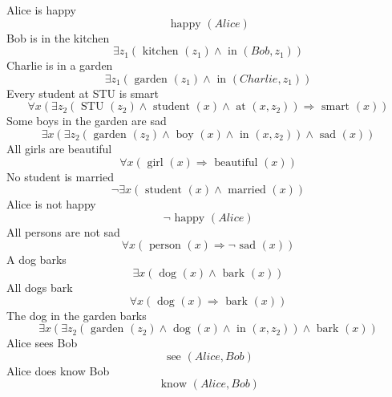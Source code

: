 \documentclass{article}
\begin{document}
Alice is happy
$$
\text{ happy } ( Alice ) 
$$
\newline
Bob is in the kitchen
$$
\exists z_1 ( \text{ kitchen } ( z_1 ) \wedge \text{ in } ( Bob , z_1 ) ) 
$$
\newline
Charlie is in a garden
$$
\exists z_1 ( \text{ garden } ( z_1 ) \wedge \text{ in } ( Charlie , z_1 ) ) 
$$
\newline
Every student at STU is smart
$$
\forall x ( \exists z_2 ( \text{ STU } ( z_2 ) \wedge \text{ student } ( x ) \wedge \text{ at } ( x , z_2 ) ) \Rightarrow \text{ smart } ( x ) ) 
$$
\newline
Some boys in the garden are sad
$$
\exists x ( \exists z_2 ( \text{ garden } ( z_2 ) \wedge \text{ boy } ( x ) \wedge \text{ in } ( x , z_2 ) ) \wedge \text{ sad } ( x ) ) 
$$
\newline
All girls are beautiful
$$
\forall x ( \text{ girl } ( x ) \Rightarrow \text{ beautiful } ( x ) ) 
$$
\newline
No student is married
$$
\neg \exists x ( \text{ student } ( x ) \wedge \text{ married } ( x ) ) 
$$
\newline
Alice is not happy
$$
\neg \text{ happy } ( Alice ) 
$$
\newline
All persons are not sad
$$
\forall x ( \text{ person } ( x ) \Rightarrow \neg \text{ sad } ( x ) ) 
$$
\newline
A dog barks
$$
\exists x ( \text{ dog } ( x ) \wedge \text{ bark } ( x ) ) 
$$
\newline
All dogs bark
$$
\forall x ( \text{ dog } ( x ) \Rightarrow \text{ bark } ( x ) ) 
$$
\newline
The dog in the garden barks
$$
\exists x ( \exists z_2 ( \text{ garden } ( z_2 ) \wedge \text{ dog } ( x ) \wedge \text{ in } ( x , z_2 ) ) \wedge \text{ bark } ( x ) ) 
$$
\newline
Alice sees Bob
$$
\text{ see } ( Alice , Bob ) 
$$
\newline
Alice does know Bob
$$
\text{ know } ( Alice , Bob ) 
$$
\newline
\end{document}
